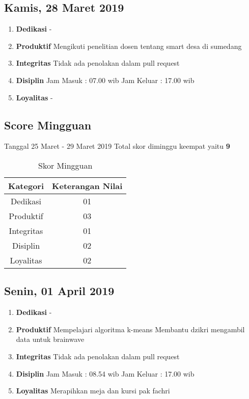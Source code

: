\subsection{Kamis, 28 Maret 2019}
\begin{enumerate}
\item \textbf{Dedikasi}
\subitem -
\item \textbf{Produktif}
\subitem Mengikuti penelitian dosen tentang smart desa di sumedang
\item \textbf{Integritas}
\subitem Tidak ada penolakan dalam pull request
\item \textbf{Disiplin}
\subitem Jam Masuk : 07.00 wib
\subitem Jam Keluar : 17.00 wib
\item \textbf{Loyalitas}
\subitem -
\end{enumerate}

\subsection{Score Mingguan} 
Tanggal 25 Maret - 29 Maret 2019 Total skor diminggu keempat yaitu \textbf{9}

\begin{table}[h]
\caption{Skor Mingguan}
\centering
\begin{tabular}{|c|c|}
\hline
\textbf{Kategori}&\textbf{Keterangan Nilai}\\
\hline
Dedikasi&01\\
\hline
Produktif&03\\
\hline
Integritas&01\\
\hline
Disiplin&02\\
\hline
Loyalitas&02\\
\hline
\end{tabular}
\label{table : skor minggu kelima}
\end{table}

\subsection{Senin, 01 April 2019}
\begin{enumerate}
\item \textbf{Dedikasi}
\subitem -
\item \textbf{Produktif}
\subitem Mempelajari algoritma k-means 
\subitem Membantu dzikri mengambil data untuk brainwave
\item \textbf{Integritas}
\subitem Tidak ada penolakan dalam pull request
\item \textbf{Disiplin}
\subitem Jam Masuk : 08.54 wib
\subitem Jam Keluar : 17.00 wib
\item \textbf{Loyalitas}
\subitem Merapihkan meja dan kursi pak fachri
\end{enumerate}


